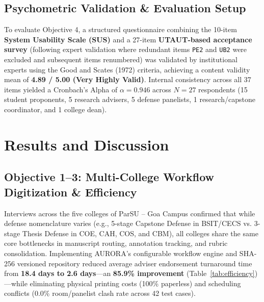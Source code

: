 \documentclass[sigplan,screen,nonacm]{acmart}
\begin{document}
\subsection{Psychometric Validation & Evaluation Setup}
To evaluate Objective 4, a structured questionnaire combining the 10-item \textbf{System Usability Scale (SUS)} \cite{brooke1996sus} and a 27-item \textbf{UTAUT-based acceptance survey} \cite{venkatesh2003user} (following expert validation where redundant items \texttt{PE2} and \texttt{UB2} were excluded and subsequent items renumbered) was validated by institutional experts using the Good and Scates (1972) criteria, achieving a content validity mean of \textbf{4.89 / 5.00 (Very Highly Valid)}. Internal consistency across all 37 items yielded a Cronbach's Alpha of $\alpha = \mathbf{0.946}$ across $N = 27$ respondents (15 student proponents, 5 research advisers, 5 defense panelists, 1 research/capstone coordinator, and 1 college dean).

\section{Results and Discussion}

\subsection{Objective 1--3: Multi-College Workflow Digitization & Efficiency}
Interviews across the five colleges of ParSU -- Goa Campus confirmed that while defense nomenclature varies (e.g., 5-stage Capstone Defense in BSIT/CECS vs. 3-stage Thesis Defense in COE, CAH, COS, and CBM), all colleges share the same core bottlenecks in manuscript routing, annotation tracking, and rubric consolidation. Implementing AURORA's configurable workflow engine and SHA-256 versioned repository reduced average adviser endorsement turnaround time from \textbf{18.4 days to 2.6 days}---an \textbf{85.9\% improvement} (Table~\ref{tab:efficiency})---while eliminating physical printing costs (100\% paperless) and scheduling conflicts (0.0\% room/panelist clash rate across 42 test cases).
\end{document}
